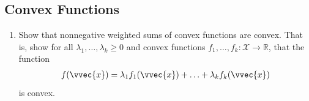 \documentclass[letterpaper,10pt,english]{jupyterBook}
\begin{document}
\subsection{Convex Functions}
\label{\detokenize{optimization_exercises:convex-functions}}\begin{enumerate}
%
\item {} 
\sphinxAtStartPar
Show that nonnegative weighted sums of convex functions are convex. That is, show
for all \(\lambda_1,\ldots,\lambda_k\geq 0\) and convex functions \(f_1,\ldots,f_k:\mathcal{X}\rightarrow \mathbb{R}\), that the function
\begin{equation*}
\begin{split}f(\vvec{x}) = \lambda_1 f_1(\vvec{x})+\ldots + \lambda_k f_k(\vvec{x})\end{split}
\end{equation*}
is convex.


\end{enumerate}
\end{document}
